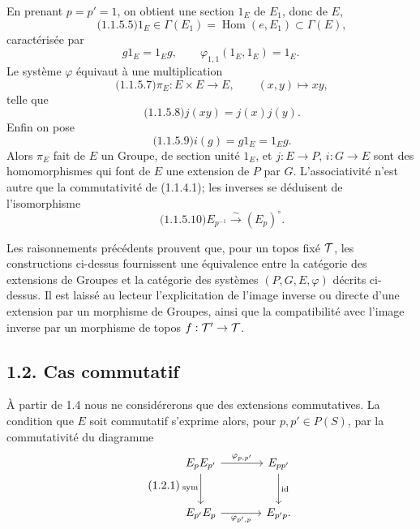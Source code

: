 \documentclass[11pt]{article}
\providecommand{\id}{\operatorname{id}}
\begin{document}
En prenant \(p=p'=1\), on obtient une section \(1_E\) de \(E_1\), donc de \(E\),
\begin{equation}\qquad\text{(1.1.5.5)}
  1_E\in\Gamma(E_1)=\operatorname{Hom}(e,E_1)\subset\Gamma(E),
\end{equation}
caractérisée par
\[
  g1_E=1_Eg,\qquad \varphi_{1,1}(1_E,1_E)=1_E.
\]
Le système \(\varphi\) équivaut à une multiplication
\begin{equation}\qquad\text{(1.1.5.7)}
  \pi_E:E\times E\longrightarrow E,\qquad (x,y)\longmapsto xy,
\end{equation}
telle que
\begin{equation}\qquad\text{(1.1.5.8)}
  j(xy)=j(x)j(y).
\end{equation}
Enfin on pose
\begin{equation}\qquad\text{(1.1.5.9)}
  i(g)=g1_E=1_Eg.
\end{equation}
Alors \(\pi_E\) fait de \(E\) un Groupe, de section unité \(1_E\), et \(j:E\to P\), \(i:G\to E\) sont des homomorphismes qui font de \(E\) une extension de \(P\) par \(G\).  L'associativité n'est autre que la commutativité de (1.1.4.1); les inverses se déduisent de l'isomorphisme
\begin{equation}\qquad\text{(1.1.5.10)}
  E_{p^{-1}}\xrightarrow{\sim}(E_p)^\circ.
\end{equation}

Les raisonnements précédents prouvent que, pour un topos fixé \(\mathcal T\), les constructions ci-dessus fournissent une équivalence entre la catégorie des extensions de Groupes et la catégorie des systèmes \((P,G,E,\varphi)\) décrits ci-dessus.  Il est laissé au lecteur l'explicitation de l'image inverse ou directe d'une extension par un morphisme de Groupes, ainsi que la compatibilité avec l'image inverse par un morphisme de topos \(f:\mathcal T'\to\mathcal T\).

\subsection*{1.2. Cas commutatif}

À partir de 1.4 nous ne considérerons que des extensions commutatives.  La condition que \(E\) soit commutatif s'exprime alors, pour \(p,p'\in P(S)\), par la commutativité du diagramme
\begin{equation}\qquad\text{(1.2.1)}
\begin{tikzcd}[column sep=large,row sep=large]
E_pE_{p'}\arrow[r,"\varphi_{p,p'}"]\arrow[d,"\sym"']&
E_{pp'}\arrow[d,"\id"]\\
E_{p'}E_p\arrow[r,"\varphi_{p',p}"']&
E_{p'p}.
\end{tikzcd}
\end{equation}
\end{document}
